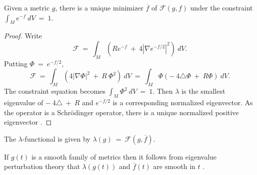 \begin{proposition}
  \label{prop:kl-invariant-its-applications-uniqueness-f-entropy}

Given a metric $g$, there is a unique minimizer
$\overline{f}$ of ${\mathcal F}(g, f)$ under the constraint
$\int_M e^{-f} \: dV \: = \: 1$.
\end{proposition}
\begin{proof}
Write
\begin{equation}
{\mathcal F} \: = \: \int_M \left( R e^{-f} \: + \: 4 |\nabla e^{-f/2}|^2
\right) \: dV.
\end{equation}
Putting $\Phi \: = \: e^{- f/2}$,
\begin{equation}
{\mathcal F} \: = \: \int_M \left( 4 |\nabla \Phi|^2 \: + \: R \: \Phi^2
\right) \: dV \: = \:
\int_M \Phi \left( - \: 4 \triangle \Phi \: + \: R \Phi
\right) \: dV.
\end{equation}
The constraint equation becomes $\int_M \Phi^2 \: dV \: = \: 1$.
Then $\lambda$ is the smallest eigenvalue of
$- \: 4 \triangle \: + \: R$ and $e^{-\overline{f}/2}$
is a corresponding normalized
eigenvector.  As the operator is a Schr\"odinger operator, there is a
unique normalized positive eigenvector \cite[Chapter XIII.12]{Reed-Simon}.
\end{proof}

\begin{definition}
  \label{def:kl-invariant-its-applications-lambda-invariant}

The $\lambda$-functional is given by
$\lambda(g) \: =\: {\mathcal F}(g, \overline{f})$.
\end{definition}

If $g(t)$ is a smooth family of metrics then it follows from eigenvalue
perturbation theory that $\lambda(g(t))$ and $\overline{f}(t)$ are
smooth in $t$ \cite[Chapter XII]{Reed-Simon}.

